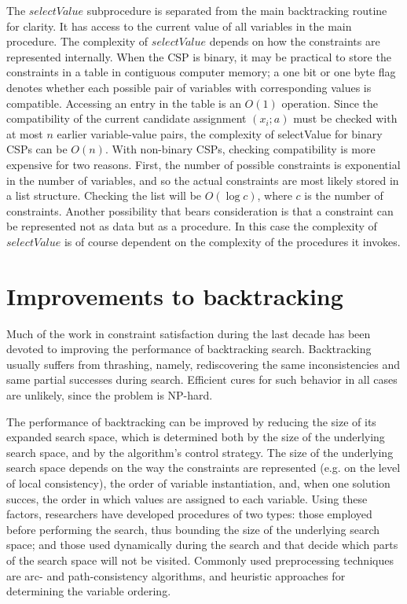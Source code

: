 \documentclass{article}
\begin{document}
The $selectValue$ subprocedure is separated from the main backtracking
routine for clarity. It has access to the current value of all variables in the main
procedure. The complexity of $selectValue$ depends on how the constraints
are represented internally. When the CSP is binary, it may be practical to store
the constraints in a table in contiguous computer memory; a one bit or one byte
flag denotes whether each possible pair of variables with corresponding values
is compatible. Accessing an entry in the table is an $O(1)$ operation. Since
the compatibility of the current candidate assignment $(x_i ; a)$ must be checked
with at most $n$ earlier variable-value pairs, the complexity of selectValue for
binary CSPs can be $O(n)$. With non-binary CSPs, checking compatibility is
more expensive for two reasons. First, the number of possible constraints is
exponential in the number of variables, and so the actual constraints are most
likely stored in a list structure. Checking the list will be $O(\log{}c)$, where $c$ is
the number of constraints. Another possibility that bears consideration is that
a constraint can be represented not as data but as a procedure. In this case the
complexity of $selectValue$ is of course dependent on the complexity of the
procedures it invokes.
\section{Improvements to backtracking}
Much of the work in constraint satisfaction during the last decade has been
devoted to improving the performance of backtracking search. Backtracking
usually suffers from thrashing, namely, rediscovering the same inconsistencies
and same partial successes during search. Efficient cures for such behavior in
all cases are unlikely, since the problem is NP-hard.

The performance of backtracking can be improved by reducing the size of
its expanded search space, which is determined both by the size of the underlying search space, and by the algorithm's control strategy. The size of the
underlying search space depends on the way the constraints are represented
(e.g. on the level of local consistency), the order of variable instantiation, and,
when one solution succes, the order in which values are assigned to each variable. Using these factors, researchers have developed procedures of two types:
those employed before performing the search, thus bounding the size of the underlying search space; and those used dynamically during the search and that
decide which parts of the search space will not be visited. Commonly used preprocessing techniques are arc- and path-consistency algorithms, and heuristic
approaches for determining the variable ordering.
\end{document}

